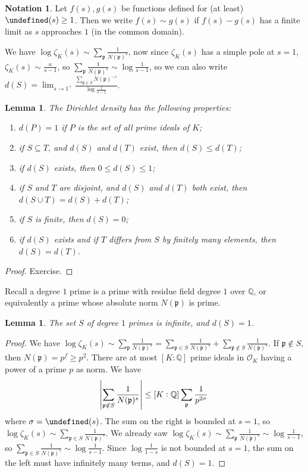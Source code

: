 \documentclass[11pt]{article}
\theoremstyle{definition}
\newtheorem{notation}[definition]{Notation}
\theoremstyle{plain}
\newtheorem{lemma}[definition]{Lemma}
\theoremstyle{remark}
\let\Re\undefined
\DeclareMathOperator{\Re}{Re}
\newcommand{\QQ}{\mathbb{Q}}
\newcommand{\cO}{\mathcal{O}}
\newcommand{\fp}{\mathfrak{p}}
\begin{document}
\begin{notation}\label{not:8_2}
    Let $f(s), g(s)$ be functions defined for (at least) $\Re(s) \ge 1$. Then we write $f(s) \sim g(s)$ if $f(s) - g(s)$ has a finite limit as $s$ approaches $1$ (in the common domain).
\end{notation}

We have $\log \zeta_K(s) \sim \sum_{\fp} \frac{1}{N(\fp)^s}$, now since $\zeta_K(s)$ has a simple pole at $s=1$, $\zeta_K(s) \sim \frac{\kappa}{s-1}$, so $\sum_{\fp} \frac{1}{N(\fp)^s} \sim \log \frac{1}{s-1}$, so we can also write $d(S) = \lim_{s \to 1^+} \frac{\sum_{\fp \in S} N(\fp)^{-s}}{\log \frac{1}{s-1}}$.

\begin{lemma}\label{lem:8_3}
    The Dirichlet density has the following properties:
    \begin{enumerate}[label=\roman*)]
        \item $d(P) = 1$ if $P$ is the set of all prime ideals of $K$;
        \item if $S \subseteq T$, and $d(S)$ and $d(T)$ exist, then $d(S) \le d(T)$;
        \item if $d(S)$ exists, then $0 \le d(S) \le 1$;
        \item if $S$ and $T$ are disjoint, and $d(S)$ and $d(T)$ both exist, then $d(S \cup T) = d(S) + d(T)$;
        \item if $S$ is finite, then $d(S) = 0$;
        \item if $d(S)$ exists and if $T$ differs from $S$ by finitely many elements, then $d(S) = d(T)$.
    \end{enumerate}
\end{lemma}
\begin{proof}
    Exercise.
\end{proof}

Recall a degree $1$ prime is a prime with residue field degree $1$ over $\QQ$, or equivalently a prime whose absolute norm $N(\fp)$ is prime.

\begin{lemma}\label{lem:8_4}
    The set $S$ of degree $1$ primes is infinite, and $d(S) = 1$.
\end{lemma}
\begin{proof}
    We have $\log \zeta_K(s) \sim \sum_{\fp} \frac{1}{N(\fp)^s} = \sum_{\fp \in S} \frac{1}{N(\fp)^s} + \sum_{\fp \notin S} \frac{1}{N(\fp)^s}$. If $\fp \notin S$, then $N(\fp) = p^f \ge p^2$. There are at most $[K : \QQ]$ prime ideals in $\cO_K$ having a power of a prime $p$ as norm. We have
    \begin{equation*}
        \abs{\sum_{\fp \notin S} \frac{1}{N(\fp)^s}} \le [K : \QQ] \sum_{\fp} \frac{1}{p^{2 \sigma}}
    \end{equation*}
    where $\sigma = \Re(s)$. The sum on the right is bounded at $s = 1$, so $\log \zeta_K(s) \sim \sum_{\fp \in S} \frac{1}{N(\fp)^s}$. We already saw $\log \zeta_K(s) \sim \sum_{\fp} \frac{1}{N(\fp)^s} \sim \log \frac{1}{s-1}$, so $\sum_{\fp \in S} \frac{1}{N(\fp)^s} \sim \log \frac{1}{s-1}$. Since $\log \frac{1}{1-s}$ is not bounded at $s=1$, the sum on the left must have infinitely many terms, and $d(S) = 1$.
\end{proof}
\end{document}
